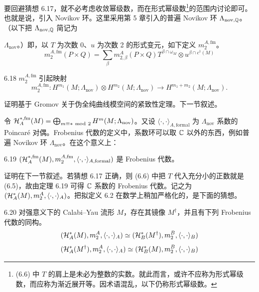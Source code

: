 要回避猜想 6.17，就不必考虑收敛幂级数，而在形式幂级数\footnote{(6.6) 中 $T$ 的肩上是未必为整数的实数。就此而言，或许不应称为形式幂级数，而应称为渐近展开等。因术语混乱，以下仍称形式幂级数。}的范围内讨论即可。也就是说，引入 Novikov 环。这里采用第 5 章引入的普遍 Novikov 环 $\Lambda_{\mathrm{nov},\mathbb{Q}}$。（以下把 $\Lambda_{\mathrm{nov},\mathbb{Q}}$ 简记为

$\Lambda_{\mathrm{nov}}$。）即，以 $T$ 为次数 0、$u$ 为次数 2 的形式变元，如下定义 $m_2^{A,\mathrm{fm}}$。
\begin{equation}
  m_2^{A,\mathrm{fm}}(P\times Q)=\sum_\beta m^A_{2,\beta}(P\times Q)T^{\beta\cap\omega_M}\otimes u^{\beta\cap c^1(M)} \tag{6.6}
\end{equation}

\begin{lemma}{6.18}
  $m_2^{A,\mathrm{fm}}$ 引起映射
  \[
    m_2^{A,\mathrm{fm}}\colon H^{m_1}(M;\Lambda_{\mathrm{nov}})\otimes H^{m_2}(M;\Lambda_{\mathrm{nov}})\to H^{m_1+m_2}(M;\Lambda_{\mathrm{nov}}).
  \]
\end{lemma}

证明基于 Gromov 关于伪全纯曲线模空间的紧致性定理。下一节叙述。

令 $\cH_A^{*,\mathrm{fm}}(M)=\bigoplus_{m\equiv*\ \mathrm{mod}\ 2}H^m(M;\Lambda_{\mathrm{nov}})$。又设 $\langle\cdot,\cdot\rangle_{A,\mathrm{formal}}$ 为 $\Lambda_{\mathrm{nov}}$ 系数的 Poincaré 对偶。Frobenius 代数的定义中，系数环可以取 $\mathbb{C}$ 以外的东西，例如普遍 Novikov 环 $\Lambda_{\mathrm{nov}}$。在这个意义上：

\begin{theorem}{6.19}
  $(\mathcal{H}_A^{*,\mathrm{fm}}(M),m_2^{A,\mathrm{fm}},\langle\cdot,\cdot\rangle_{A,\mathrm{formal}})$ 是 Frobenius 代数。
\end{theorem}

证明在下一节叙述。若猜想 6.17 正确，则 (6.6) 中把 $T$ 代入充分小的正数就是 (6.5)，故由定理 6.19 可得 $\mathbb{C}$ 系数的 Frobenius 代数。记之为 $(\mathcal{H}_A^*(M),m_2^A,\langle\cdot,\cdot\rangle_A)$。把拟定义 6.2 在数学上稍加严格化的，是下面的猜想。

\begin{conjecture}{6.20}
  对强意义下的 Calabi–Yau 流形 $M$，存在其镜像 $M^\dagger$，并且有下列 Frobenius 代数的同构。
  \[
    (\mathcal{H}_A^*(M),m_2^A,\langle\cdot,\cdot\rangle_A)\simeq(\mathcal{H}_B^*(M^\dagger),m_2^B,\langle\cdot,\cdot\rangle_B)
  \]
  \[
    (\mathcal{H}_A^*(M^\dagger),m_2^A,\langle\cdot,\cdot\rangle_A)\simeq(\mathcal{H}_B^*(M),m_2^B,\langle\cdot,\cdot\rangle_B)
  \]
\end{conjecture}

